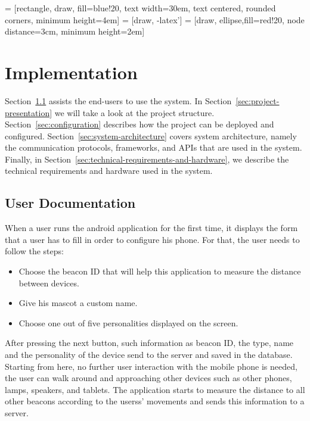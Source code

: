  = [rectangle, draw, fill=blue!20,
text width=30em, text centered, rounded corners, minimum height=4em]
 = [draw, -latex']
 = [draw, ellipse,fill=red!20, node distance=3cm,
minimum height=2em]

\chapter{Implementation}
\label{ch:implementation}
Section~\ref{sec:user-documentation} assists the end-users to use the system.
In Section~\ref{sec:project-presentation} we will take a look at the project structure.
Section~\ref{sec:configuration} describes how the project can be deployed and configured.
Section~\ref{sec:system-architecture} covers system architecture, namely the
communication protocols, frameworks, and APIs that are used in the system.
Finally, in Section~\ref{sec:technical-requirements-and-hardware}, we describe the technical
requirements and hardware used in the system.

\section{User Documentation}
\label{sec:user-documentation}
When a user runs the android application for the first time, it displays the form that a
user has to fill in order to configure his phone.
For that, the user needs to follow the steps:

\begin{itemize}
    \item Choose the beacon ID that will help this application to measure the distance between devices.
    \item Give his mascot a custom name.
    \item Choose one out of five personalities displayed on the screen.
\end{itemize}

After pressing the next button, such information as beacon ID,
the type, name and the personality of the device send to the server and saved in the database.
Starting from here, no further user interaction with the mobile phone is needed, the user can walk
around and approaching other devices such as other phones, lamps, speakers, and tablets.
The application starts to measure the distance to all other beacons according to the userss'
movements and sends this information to a server.

